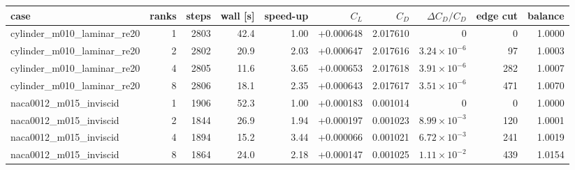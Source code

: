 \footnotesize
\begin{tabular}{lrrrrrrrrr}
\toprule
case & ranks & steps & wall [s] & speed-up & $C_L$ & $C_D$ & $\Delta C_D/C_D$ & edge cut & balance\\
\midrule
cylinder\_m010\_laminar\_re20 & 1 & 2803 & 42.4 & 1.00 & +0.000648 & 2.017610 & 0 & 0 & 1.0000\\
cylinder\_m010\_laminar\_re20 & 2 & 2802 & 20.9 & 2.03 & +0.000647 & 2.017616 & $3.24\times 10^{-6}$ & 97 & 1.0003\\
cylinder\_m010\_laminar\_re20 & 4 & 2805 & 11.6 & 3.65 & +0.000653 & 2.017618 & $3.91\times 10^{-6}$ & 282 & 1.0007\\
cylinder\_m010\_laminar\_re20 & 8 & 2806 & 18.1 & 2.35 & +0.000643 & 2.017617 & $3.51\times 10^{-6}$ & 471 & 1.0070\\
\midrule
naca0012\_m015\_inviscid & 1 & 1906 & 52.3 & 1.00 & +0.000183 & 0.001014 & 0 & 0 & 1.0000\\
naca0012\_m015\_inviscid & 2 & 1844 & 26.9 & 1.94 & +0.000197 & 0.001023 & $8.99\times 10^{-3}$ & 120 & 1.0001\\
naca0012\_m015\_inviscid & 4 & 1894 & 15.2 & 3.44 & +0.000066 & 0.001021 & $6.72\times 10^{-3}$ & 241 & 1.0019\\
naca0012\_m015\_inviscid & 8 & 1864 & 24.0 & 2.18 & +0.000147 & 0.001025 & $1.11\times 10^{-2}$ & 439 & 1.0154\\
\bottomrule
\end{tabular}
